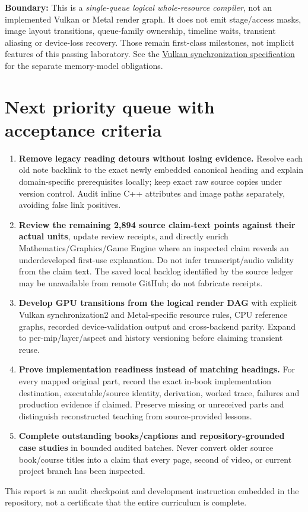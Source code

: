 \textbf{Boundary:} This is a \emph{single-queue logical whole-resource compiler}, not an implemented Vulkan or Metal render graph. It does not emit stage/access masks, image layout transitions, queue-family ownership, timeline waits, transient aliasing or device-loss recovery. Those remain first-class milestones, not implicit features of this passing laboratory. See the \href{https://docs.vulkan.org/spec/latest/chapters/synchronization.html}{Vulkan synchronization specification} for the separate memory-model obligations.

\section{Next priority queue with acceptance criteria}\label{appendix-28e6f216fdc7-next-priority-queue-with-acceptance-criteria}

\begin{enumerate}
\def\labelenumi{\arabic{enumi}.}
\tightlist
\item
  \textbf{Remove legacy reading detours without losing evidence.} Resolve each old note backlink to the exact newly embedded canonical heading and explain domain-specific prerequisites locally; keep exact raw source copies under version control. Audit inline C++ attributes and image paths separately, avoiding false link positives.
\item
  \textbf{Review the remaining 2,894 source claim-text points against their actual units}, update review receipts, and directly enrich Mathematics/Graphics/Game Engine where an inspected claim reveals an underdeveloped first-use explanation. Do not infer transcript/audio validity from the claim text. The saved local backlog identified by the source ledger may be unavailable from remote GitHub; do not fabricate receipts.
\item
  \textbf{Develop GPU transitions from the logical render DAG} with explicit Vulkan synchronization2 and Metal-specific resource rules, CPU reference graphs, recorded device-validation output and cross-backend parity. Expand to per-mip/layer/aspect and history versioning before claiming transient reuse.
\item
  \textbf{Prove implementation readiness instead of matching headings.} For every mapped original part, record the exact in-book implementation destination, executable/source identity, derivation, worked trace, failures and production evidence if claimed. Preserve missing or unreceived parts and distinguish reconstructed teaching from source-provided lessons.
\item
  \textbf{Complete outstanding books/captions and repository-grounded case studies} in bounded audited batches. Never convert older source book/course titles into a claim that every page, second of video, or current project branch has been inspected.
\end{enumerate}

This report is an audit checkpoint and development instruction embedded in the repository, not a certificate that the entire curriculum is complete.
